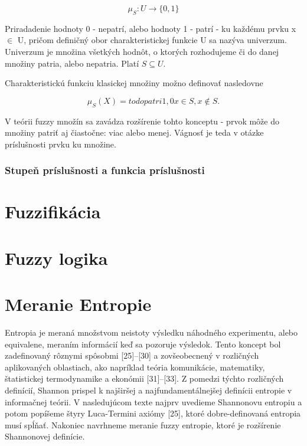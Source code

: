 \begin{equation}\label{charfunkcia}
\mu_S : U \longrightarrow \{0, 1\}
\end{equation}

Priradadenie hodnoty 0 - nepatrí, alebo hodnoty 1 - patrí - ku každému prvku x $\in$ U, pričom definičný obor charakteristickej funkcie U sa nazýva univerzum. Univerzum je množina všetkých hodnôt, o ktorých rozhodujeme či do danej množiny patria, alebo nepatria. Platí $S \subseteq U$. 

Charakteristickú funkciu klasickej množiny možno definovať nasledovne

\begin{equation}\label{charfunkciafuzzy}
\mu_S (X) = todo patri 1, 0 x \in S , x \notin S. 
\end{equation}

V teórii fuzzy množín sa zavádza rozšírenie tohto konceptu - prvok môže do množiny patriť aj čiastočne: viac alebo menej. Vágnosť je teda v otázke príslušnosti prvku ku množine. 

\subsubsection{Stupeň príslušnosti a funkcia príslušnosti}





\section{Fuzzifikácia}






\section{Fuzzy logika }

\section{Meranie Entropie}
Entropia je meraná množstvom neistoty výsledku náhodného experimentu, alebo equivalene, meraním informácií keď sa pozoruje výsledok. Tento koncept bol zadefinovaný rôznymi spôsobmi [25]–[30] a zovšeobecnený v rozličných aplikovaných oblastiach, ako napríklad teória komunikácie, matematiky, štatistickej termodynamike a ekonómii [31]–[33]. Z pomedzi týchto rozličných definícií, Shannon prispel k najširšej a najfundamentálnejšej definícii entropie v informačnej teórii. V nasledujúcom texte najprv uvedieme Shannonovu entropiu a potom popíšeme štyry Luca-Termini axiómy [25], ktoré dobre-definovaná entropia musí spĺňať. Nakoniec navrhneme meranie fuzzy entropie, ktoré je rozšírenie Shannonovej definície.

